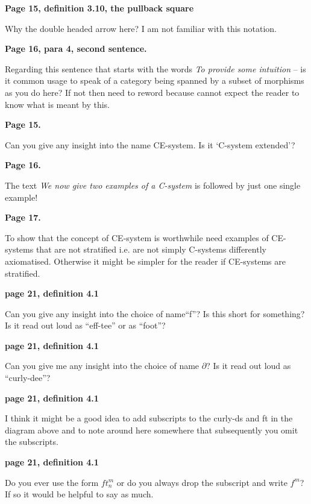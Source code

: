 \documentclass[10pt,a4paper]{scrartcl}
\newenvironment{comment}[1]
{\begin{framed}
\textbf{#1}
}
{
\end{framed}
}
\begin{document}
\begin{comment}{Page 15, definition 3.10, the pullback square}
Why the double headed arrow here? I am not familiar with this notation.
\end{comment} 

\begin{comment}{Page 16, para 4, second sentence.}
Regarding this sentence that starts with the words \textit{To provide some intuition} --
is it common usage to speak of a category being spanned by a subset of morphisms as you do here? If not then need to reword because cannot expect the reader to know what is meant by this. 
\end{comment} 

\begin{comment}{Page 15.}
Can you give any insight into the name CE-system. Is it `C-system extended'? 
\end{comment} 

\begin{comment}{Page 16.}
The text \textit{We now give two examples of a C-system} is followed by just one single example!
\end{comment} 

\begin{comment}{Page 17.}
To show that the concept of CE-system is worthwhile need examples of CE-systems that are not stratified i.e. are not simply C-systems differently axiomatised. Otherwise it might be simpler for the reader if CE-systems are stratified. 
\end{comment} 

\begin{comment}{page 21, definition 4.1}
Can you give any insight into the choice of name``f''?
Is this short for something?
Is it read out loud as ``eff-tee'' or as ``foot''?
\end{comment} 
\begin{comment}{page 21, definition 4.1}
Can you give me any insight into the choice of name $\partial$?
Is it read out loud as ``curly-dee''?
\end{comment} 

\begin{comment}{page 21, definition 4.1}
I think it might be a good idea to add subscripts to the curly-ds and ft in the diagram above and to note around here somewhere that subsequently you omit the subscripts. 
\end{comment} 
\begin{comment}{page 21, definition 4.1}
Do you ever use the form $ft_n^m$ or do you always drop the subscript and write $f^m$? If so it would be helpful to say as much.
\end{comment} 
\end{document}
